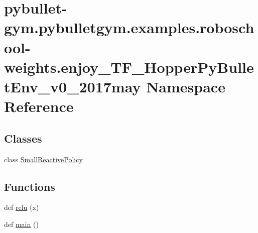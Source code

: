 \hypertarget{namespacepybullet-gym_1_1pybulletgym_1_1examples_1_1roboschool-weights_1_1enjoy___t_f___hopper_py_bullet_env__v0__2017may}{}\section{pybullet-\/gym.pybulletgym.\+examples.\+roboschool-\/weights.enjoy\+\_\+\+T\+F\+\_\+\+Hopper\+Py\+Bullet\+Env\+\_\+v0\+\_\+2017may Namespace Reference}
\label{namespacepybullet-gym_1_1pybulletgym_1_1examples_1_1roboschool-weights_1_1enjoy___t_f___hopper_py_bullet_env__v0__2017may}
\subsection*{Classes}
\begin{DoxyCompactItemize}
\item 
class \hyperlink{classpybullet-gym_1_1pybulletgym_1_1examples_1_1roboschool-weights_1_1enjoy___t_f___hopper_py_budd62104b3cef5471ac6043ee1ba11699}{Small\+Reactive\+Policy}
\end{DoxyCompactItemize}
\subsection*{Functions}
\begin{DoxyCompactItemize}
\item 
def \hyperlink{namespacepybullet-gym_1_1pybulletgym_1_1examples_1_1roboschool-weights_1_1enjoy___t_f___hopper_py_bullet_env__v0__2017may_ae9488bccedf3889700be6c427be9983e}{relu} (x)
\item 
def \hyperlink{namespacepybullet-gym_1_1pybulletgym_1_1examples_1_1roboschool-weights_1_1enjoy___t_f___hopper_py_bullet_env__v0__2017may_ae8c829a391b9d394f59f50f09704a27a}{main} ()
\end{DoxyCompactItemize}
